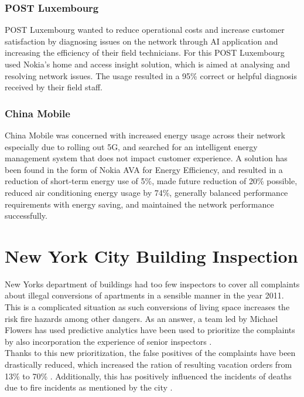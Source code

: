 \documentclass[a4paper,12pt]{report}
\begin{document}
			\subsubsection{POST Luxembourg} 
				POST Luxembourg wanted to reduce operational costs and increase customer satisfaction by diagnosing issues on the network through AI application and increasing the efficiency of their field technicians.
			For this POST Luxembourg used Nokia's home and access insight solution, which is aimed at analysing and resolving network issues. The usage resulted in a 95\% correct or helpful diagnosis received by their field staff.
			\subsubsection{China Mobile}
				China Mobile was concerned with increased energy usage across their network especially due to rolling out 5G, and searched for an intelligent energy management system that does not impact customer experience.
			A solution has been found in the form of Nokia AVA for Energy Efficiency, and resulted in a reduction of short-term energy use of 5\%, made future reduction of 20\% possible, reduced air conditioning energy usage by 74\%, generally balanced performance requirements with energy saving, and maintained the network performance successfully.
		\closesection
	\closesection

	\section{New York City Building Inspection}
	\startsection
		New Yorks department of buildings had too few inspectors to cover all complaints about illegal conversions of apartments in a sensible manner in the year 2011. This is a complicated situation as such conversions of living space increases the risk fire hazards among other dangers. As an answer, a team led by Michael Flowers has used predictive analytics have been used to prioritize the complaints by also incorporation the experience of senior inspectors \cite{BeyondOpenData}. \\
		Thanks to this new prioritization, the false positives of the complaints have been drastically reduced, which increased the ration of resulting vacation orders from 13\% to 70\% \cite{PredictiveDataAnalytics}.
		Additionally, this has positively influenced the incidents of deaths due to fire incidents as mentioned by the city \cite{BigDataBigApple} \cite{FDNY}.
	\closesection
\end{document}
